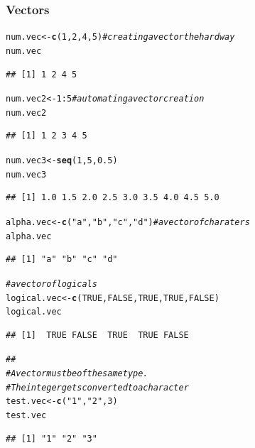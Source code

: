 \documentclass[draft]{article}\usepackage[]{graphicx}\usepackage[]{color}
\makeatletter
\newcommand{\hlnum}[1]{\textcolor[rgb]{0.686,0.059,0.569}{#1}}%
\newcommand{\hlstr}[1]{\textcolor[rgb]{0.192,0.494,0.8}{#1}}%
\newcommand{\hlcom}[1]{\textcolor[rgb]{0.678,0.584,0.686}{\textit{#1}}}%
\newcommand{\hlopt}[1]{\textcolor[rgb]{0,0,0}{#1}}%
\newcommand{\hlstd}[1]{\textcolor[rgb]{0.345,0.345,0.345}{#1}}%
\newcommand{\hlkwb}[1]{\textcolor[rgb]{0.69,0.353,0.396}{#1}}%
\newcommand{\hlkwd}[1]{\textcolor[rgb]{0.737,0.353,0.396}{\textbf{#1}}}%
\newenvironment{kframe}{%
 \def\at@end@of@kframe{}%
 \ifinner\ifhmode%
  \def\at@end@of@kframe{\end{minipage}}%
  \begin{minipage}{\columnwidth}%
 \fi\fi%
 \def\FrameCommand##1{\hskip\@totalleftmargin \hskip-\fboxsep
 \colorbox{shadecolor}{##1}\hskip-\fboxsep
     \hskip-\linewidth \hskip-\@totalleftmargin \hskip\columnwidth}%
 \MakeFramed {\advance\hsize-\width
   \@totalleftmargin\z@ \linewidth\hsize
   \@setminipage}}%
 {\par\unskip\endMakeFramed%
 \at@end@of@kframe}
\newenvironment{knitrout}{}{} %
\makeatother
\begin{document}
    \subsubsection*{Vectors}
\begin{knitrout}
\color{fgcolor}\begin{kframe}
\begin{alltt}
  \hlstd{num.vec} \hlkwb{<-} \hlkwd{c}\hlstd{(}\hlnum{1}\hlstd{,} \hlnum{2}\hlstd{,} \hlnum{4}\hlstd{,} \hlnum{5}\hlstd{)}  \hlcom{# creating a vector the hard way}
  \hlstd{num.vec}
\end{alltt}
\begin{verbatim}
## [1] 1 2 4 5
\end{verbatim}
\begin{alltt}
  \hlstd{num.vec2} \hlkwb{<-} \hlnum{1}\hlopt{:}\hlnum{5} \hlcom{# automating a vector creation}
  \hlstd{num.vec2}
\end{alltt}
\begin{verbatim}
## [1] 1 2 3 4 5
\end{verbatim}
\begin{alltt}
  \hlstd{num.vec3} \hlkwb{<-} \hlkwd{seq}\hlstd{(}\hlnum{1}\hlstd{,} \hlnum{5}\hlstd{,} \hlnum{0.5}\hlstd{)}
  \hlstd{num.vec3}
\end{alltt}
\begin{verbatim}
## [1] 1.0 1.5 2.0 2.5 3.0 3.5 4.0 4.5 5.0
\end{verbatim}
\begin{alltt}
  \hlstd{alpha.vec} \hlkwb{<-} \hlkwd{c}\hlstd{(}\hlstr{"a"}\hlstd{,} \hlstr{"b"}\hlstd{,} \hlstr{"c"}\hlstd{,} \hlstr{"d"}\hlstd{)}  \hlcom{# a vector of charaters}
  \hlstd{alpha.vec}
\end{alltt}
\begin{verbatim}
## [1] "a" "b" "c" "d"
\end{verbatim}
\begin{alltt}
  \hlcom{# a vector of logicals}
  \hlstd{logical.vec} \hlkwb{<-} \hlkwd{c}\hlstd{(}\hlnum{TRUE}\hlstd{,} \hlnum{FALSE}\hlstd{,} \hlnum{TRUE}\hlstd{,} \hlnum{TRUE}\hlstd{,} \hlnum{FALSE}\hlstd{)}
  \hlstd{logical.vec}
\end{alltt}
\begin{verbatim}
## [1]  TRUE FALSE  TRUE  TRUE FALSE
\end{verbatim}
\begin{alltt}
  \hlcom{##}
  \hlcom{# A vector must be of the same type. }
   \hlcom{# The integer gets converted to a character}
  \hlstd{test.vec} \hlkwb{<-} \hlkwd{c}\hlstd{(}\hlstr{"1"}\hlstd{,} \hlstr{"2"}\hlstd{,} \hlnum{3}\hlstd{)}
  \hlstd{test.vec}
\end{alltt}
\begin{verbatim}
## [1] "1" "2" "3"
\end{verbatim}
\end{kframe}
\end{knitrout}
    
\end{document}
